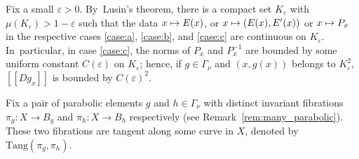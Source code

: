 \documentclass[JEP,XML,SOM,Unicode,published]{cedram}
\newcommand\mto{\mathchoice{\longmapsto}{\mapsto}{\mapsto}{\mapsto}}
\newcommand{\llbracket}{[\![}
\newcommand{\rrbracket}{]\!]}
\let\e\varepsilon
\newcommand{\Tang}{{\mathrm{Tang}}}
\theoremstyle{plain}
\theoremstyle{definition}
\begin{document}
Fix a small $\e>0$. By~Lusin's
theorem, there is a compact set $K_\e $ with $\mu(K_\e)>1-\e$
such that the data $x\mto E(x)$, or $x\mto (E(x), E'(x))$ or $x\mto P_x$ in the respective
cases \eqref{case:a}, \eqref{case:b}, and \eqref{case:c}
are continuous on $K_\e$. In~particular, in case \eqref{case:c}, the norms of $P_x$ and $P_x^{-1}$ are bounded by some uniform constant $C(\e)$
on $K_\e$; hence, if $g\in \Gamma_\nu$ and $(x,g(x))$ belongs to $K_\e^2$, $\llbracket Dg_x \rrbracket$ is bounded by $C(\e)^2$.

Fix a pair of parabolic elements $g$ and $h\in \Gamma_\nu$ with distinct invariant fibrations $\pi_g\colon X\to B_g$ and $\pi_h\colon X\to B_h$
respectively (see Remark~\ref{rem:many_parabolic}). These two fibrations are tangent along some curve in $X$, denoted by $\Tang(\pi_g, \pi_h)$.
\end{document}
